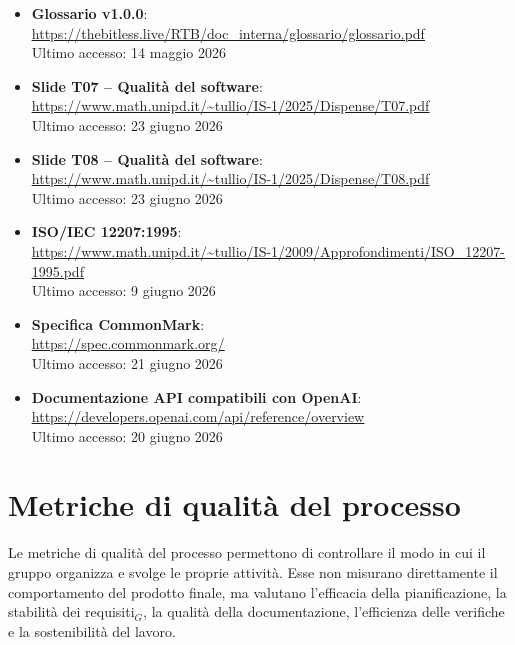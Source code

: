 \documentclass[a4paper, 10pt, colorlinks=true, linkcolor=black, urlcolor=blue, citecolor=blue, hidelinks]{article}
\newcommand{\reflink}[1]{{\footnotesize\underline{\url{#1}}}}
\begin{document}
\begin{itemize}
    \item \textbf{Glossario v1.0.0}: \\
    \reflink{https://thebitless.live/RTB/doc_interna/glossario/glossario.pdf} \\
    Ultimo accesso: 14 maggio 2026

    \item \textbf{Slide T07 -- Qualità del software}: \\
    \reflink{https://www.math.unipd.it/~tullio/IS-1/2025/Dispense/T07.pdf} \\
    Ultimo accesso: 23 giugno 2026

    \item \textbf{Slide T08 -- Qualità del software}: \\
    \reflink{https://www.math.unipd.it/~tullio/IS-1/2025/Dispense/T08.pdf} \\
    Ultimo accesso: 23 giugno 2026

    \item \textbf{ISO/IEC 12207:1995}: \\
    \reflink{https://www.math.unipd.it/~tullio/IS-1/2009/Approfondimenti/ISO_12207-1995.pdf} \\
    Ultimo accesso: 9 giugno 2026

    \item \textbf{Specifica CommonMark}: \\
    \reflink{https://spec.commonmark.org/} \\
    Ultimo accesso: 21 giugno 2026

    \item \textbf{Documentazione API compatibili con OpenAI}: \\
    \reflink{https://developers.openai.com/api/reference/overview} \\
    Ultimo accesso: 20 giugno 2026
\end{itemize}

\section{Metriche di qualità del processo}

Le metriche di qualità del processo permettono di controllare il modo in cui il gruppo organizza e svolge le proprie attività. Esse non misurano direttamente il comportamento del prodotto finale, ma valutano l'efficacia della pianificazione, la stabilità dei requisiti$_G$, la qualità della documentazione, l'efficienza delle verifiche e la sostenibilità del lavoro.
\end{document}
